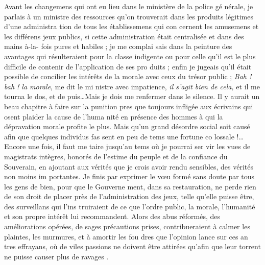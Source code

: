 Avant les changemens qui ont eu
lieu dans le ministère de la police gé%
nérale, je parlais à un ministre des
ressources qu'on trouverait dans les
produits légitimes d'une administra%
tion de tous les établissemens qui con%
cernent les amusemens et les différens
jeux publics, si cette administration
était centralisée et dans des mains à-la-%
fois pures et habiles ; je me complai%
sais dans la peinture des avantages qui
résulteraient pour la classe indigente
ou pour celle qu'il est le plus difficile
de contenir de l'application de ses pro%
duits \notemark ; enfin je jugeais qu'il était
possible de concilier les intérêts de la
morale avec ceux du trésor public ;
\emph{Bah ! bah ! la morale}, me dit le mi%
nistre avec impatience, \emph{il s'agit bien
de cela,} et il me tourna le dos, et de%
puis\ldots Mais je dois me renfermer
dans le silence. Il y aurait un beau
chapitre à faire sur la punition pres%
que toujours infligée aux écrivains
qui osent plaider la cause de l'huma%
nité en présence des hommes à qui la
dépravation morale profite le plus.
Mais qu'un grand désordre social soit
causé afin que quelques individus fas%
sent en peu de tems une fortune co%
lossale !\ldots Encore une fois, il faut me
taire jusqu'au tems où je pourrai ser%
vir les vues de magistrats intègres,
honorés de l'estime du peuple et de la
confiance du Souverain, en ajoutant
aux vérités que je crois avoir rendu
sensibles, des vérités non moins im%
portantes. Je finis par exprimer le
vœu formé sans doute par tous les
gens de bien, pour que le Gouverne%
ment, dans sa restauration, ne perde
rien de son droit de placer près de
l'administration des jeux, telle qu'elle
puisse être, des surveillans qui l'ins%
truiraient de ce que l'ordre public,
la morale, l'humanité et son propre
intérêt lui recommandent. Alors des
abus réformés, des améliorations
opérées, de sages précautions prises,
contribueraient à calmer les plaintes,
les murmures, et à amortir les fou%
dres que l'opinion lance sur ces an%
tres effrayans, où de viles passions
ne doivent être attirées qu'afin que
leur torrent ne puisse causer plus de
ravages \notemark.
